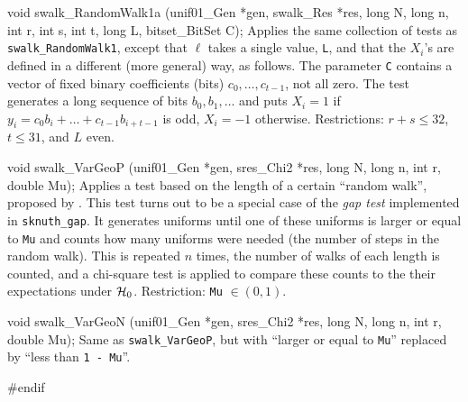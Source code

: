 void swalk_RandomWalk1a (unif01_Gen *gen, swalk_Res *res, long N, long n,
                         int r, int s, int t, long L, bitset_BitSet C);
\endcode
 \tab
   Applies the same collection of tests 
   as {\tt swalk\_RandomWalk1},
   except that $\ell$ takes a single value, {\tt L}, and that
   the $X_i$'s are defined in a different (more general) way, as follows.
   The parameter {\tt C} contains a vector of fixed binary coefficients
   (bits) $c_0,\dots,c_{t-1}$, not all zero.
   The test generates a long sequence of bits $b_0, b_1, \dots$ and puts
   $X_i = 1$ if $y_i = c_0 b_i + \dots + c_{t-1} b_{i+t-1}$
   is odd, $X_i = -1$ otherwise.
   Restrictions: $r+s \le 32$, $t \le 31$, and $L$ even.
 \endtab
\code


void swalk_VarGeoP (unif01_Gen *gen, sres_Chi2 *res,
                    long N, long n, int r, double Mu);
\endcode
 \tab
  Applies a test  
  based on the length of a certain ``random walk'',
  proposed by \cite{rSHC97a}.
  This test turns out to be a special case of the {\em gap test\/}
  implemented in {\tt sknuth\_gap}.
  It generates uniforms until one of these uniforms is larger or equal
  to {\tt Mu} and counts how many uniforms were needed (the number of steps
  in the random walk).
  This is repeated $n$ times, the number of walks of each length is
  counted, and a chi-square test is applied to compare these counts
  to the their expectations under $\mathcal{H}_0$.
  Restriction: {\tt Mu} $\in (0, 1)$.
 \endtab
\code


void swalk_VarGeoN (unif01_Gen *gen, sres_Chi2 *res,
                    long N, long n, int r, double Mu);
\endcode
 \tab
  Same as {\tt swalk\_VarGeoP},  
  but with ``larger or equal to
  {\tt Mu}'' replaced by ``less than {\tt 1 - Mu}''.
 \endtab

\code
\hide
#endif
\endhide
\endcode
